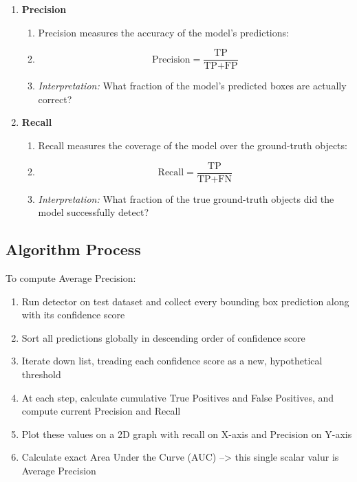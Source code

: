\documentclass[12pt]{article}
\begin{document}
\begin{enumerate}
    \item \textbf{Precision}
          \begin{enumerate}
              \item Precision measures the accuracy of the model's predictions:
              \item \begin{equation}
                        \text{Precision} = \frac{\text{TP}}{\text{TP} + \text{FP}}
                    \end{equation}
              \item \textit{Interpretation:} What fraction of the model's predicted boxes are actually correct?
          \end{enumerate}
    \item \textbf{Recall}
          \begin{enumerate}
              \item Recall measures the coverage of the model over the ground-truth objects:
              \item \begin{equation}
                        \text{Recall} = \frac{\text{TP}}{\text{TP} + \text{FN}}
                    \end{equation}
              \item \textit{Interpretation:} What fraction of the true ground-truth objects did the model successfully detect?
          \end{enumerate}
\end{enumerate}

\subsection{Algorithm Process}
To compute Average Precision:
\begin{enumerate}
    \item Run detector on test dataset and collect every bounding box prediction along with its confidence score
    \item Sort all predictions globally in descending order of confidence score
    \item Iterate down list, treading each confidence score as a new, hypothetical threshold
    \item At each step, calculate cumulative True Positives and False Positives, and compute current Precision and Recall
    \item Plot these values on a 2D graph with recall on X-axis and Precision on Y-axis
    \item Calculate exact Area Under the Curve (AUC) --> this single scalar valur is Average Precision
\end{enumerate}
\end{document}
